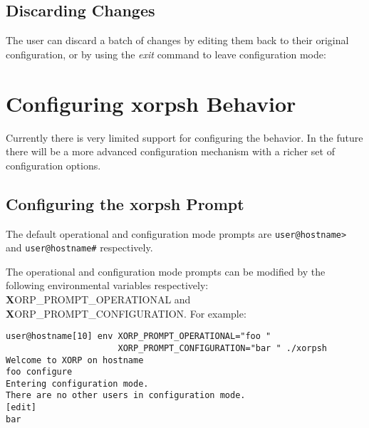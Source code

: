 \subsection{Discarding Changes}

The user can discard a batch of changes by editing them back to their
original configuration, or by using the \emph{exit} command to leave
configuration mode:
\vspace{0.1in}

\noindent{}
\vspace{0.1in}

\section{Configuring xorpsh Behavior}
\label{xorpsh:configuring-xorpsh-behavior}

Currently there is very limited support for configuring the \xorpsh
behavior. In the future there will be a more advanced configuration
mechanism with a richer set of configuration options.

\subsection{Configuring the xorpsh Prompt}

The default operational and configuration mode prompts are
\verb=user@hostname>= and \verb=user@hostname#= respectively.

The operational and configuration mode prompts can be modified by the
following environmental variables respectively:
{\textbf XORP\_PROMPT\_OPERATIONAL} and
{\textbf XORP\_PROMPT\_CONFIGURATION}. For example:

\begin{verbatim}
user@hostname[10] env XORP_PROMPT_OPERATIONAL="foo " 
                      XORP_PROMPT_CONFIGURATION="bar " ./xorpsh
Welcome to XORP on hostname
foo configure
Entering configuration mode.
There are no other users in configuration mode.
[edit]
bar 
\end{verbatim}

